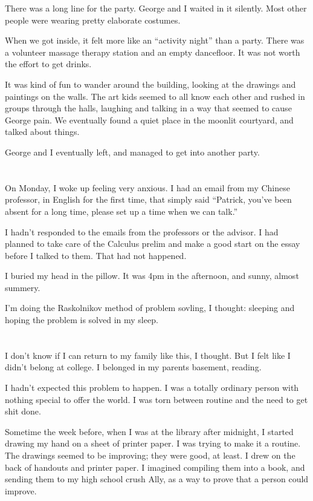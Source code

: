 There was a long line for the party.  George and I waited in it silently.  Most
other people were wearing pretty elaborate costumes.

When we got inside, it felt more like an ``activity night'' than a party.  There
was a volunteer massage therapy station and an empty dancefloor.  It was not
worth the effort to get drinks.  

It was kind of fun to wander around the building, looking at the drawings and
paintings on the walls.  The art kids seemed to all know each other and rushed
in groups through the halls, laughing and talking in a way that seemed to cause
George pain.  We eventually found a quiet place in the moonlit courtyard, and
talked about things. 

George and I eventually left, and managed to get into another party.

\section{}

On Monday, I woke up feeling very anxious.  I had an email from my Chinese
professor, in English for the first time, that simply said ``Patrick, you've
been absent for a long time, please set up a time when we can talk.''

I hadn't responded to the emails from the professors or the advisor.  I had
planned to take care of the Calculus prelim and make a good start on the essay
before I talked to them.  That had not happened.

I buried my head in the pillow.  It was 4pm in the afternoon, and sunny, almost
summery. 

I'm doing the Raskolnikov method of problem sovling, I thought: sleeping and
hoping the problem is solved in my sleep.

\section{}

I don't know if I can return to my family like this, I thought.  But I felt like
I didn't belong at college.  I belonged in my parents basement, reading. 

I hadn't expected this problem to happen.  I was a totally ordinary person with
nothing special to offer the world.  I was torn between routine and the need to
get shit done.    

Sometime the week before, when I was at the library after midnight, I started
drawing my hand on a sheet of printer paper.  I was trying to make it a routine.
The drawings seemed to be improving; they were good, at least.  I drew on the
back of handouts and printer paper.  I imagined compiling them into a book, and
sending them to my high school crush Ally, as a way to prove that a person could
improve.  

